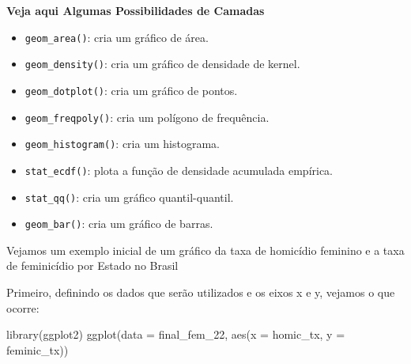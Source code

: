 \documentclass[
  letterpaper,
  DIV=11,
  numbers=noendperiod]{scrreprt}
\newenvironment{Shaded}{\begin{snugshade}}{\end{snugshade}}
\newcommand{\AttributeTok}[1]{\textcolor[rgb]{0.40,0.45,0.13}{#1}}
\newcommand{\FunctionTok}[1]{\textcolor[rgb]{0.28,0.35,0.67}{#1}}
\newcommand{\NormalTok}[1]{\textcolor[rgb]{0.00,0.23,0.31}{#1}}
\providecommand{\tightlist}{%
  \setlength{\itemsep}{0pt}\setlength{\parskip}{0pt}}
\begin{document}
\begin{tcolorbox}[enhanced jigsaw, bottomrule=.15mm, leftrule=.75mm, arc=.35mm, colframe=quarto-callout-note-color-frame, breakable, opacityback=0, toprule=.15mm, colback=white, left=2mm, rightrule=.15mm]
\begin{minipage}[t]{5.5mm}
\textcolor{quarto-callout-note-color}{\faInfo}
\end{minipage}%
\begin{minipage}[t]{\textwidth - 5.5mm}

\vspace{-3mm}\textbf{Veja aqui Algumas Possibilidades de Camadas}\vspace{3mm}

\begin{itemize}
\tightlist
\item
  \texttt{geom\_area()}: cria um gráfico de área.\\
\item
  \texttt{geom\_density()}: cria um gráfico de densidade de kernel.\\
\item
  \texttt{geom\_dotplot()}: cria um gráfico de pontos.\\
\item
  \texttt{geom\_freqpoly()}: cria um polígono de frequência.\\
\item
  \texttt{geom\_histogram()}: cria um histograma.\\
\item
  \texttt{stat\_ecdf()}: plota a função de densidade acumulada
  empírica.\\
\item
  \texttt{stat\_qq()}: cria um gráfico quantil-quantil.\\
\item
  \texttt{geom\_bar()}: cria um gráfico de barras.
\end{itemize}

\end{minipage}%
\end{tcolorbox}

Vejamos um exemplo inicial de um gráfico da taxa de homicídio feminino e
a taxa de feminicídio por Estado no Brasil

Primeiro, definindo os dados que serão utilizados e os eixos x e y,
vejamos o que ocorre:

\begin{Shaded}
\begin{Highlighting}[]
\FunctionTok{library}\NormalTok{(ggplot2)}
\FunctionTok{ggplot}\NormalTok{(}\AttributeTok{data =}\NormalTok{ final\_fem\_22, }\FunctionTok{aes}\NormalTok{(}\AttributeTok{x =}\NormalTok{ homic\_tx, }\AttributeTok{y =}\NormalTok{ feminic\_tx))}
\end{Highlighting}
\end{Shaded}
\end{document}
